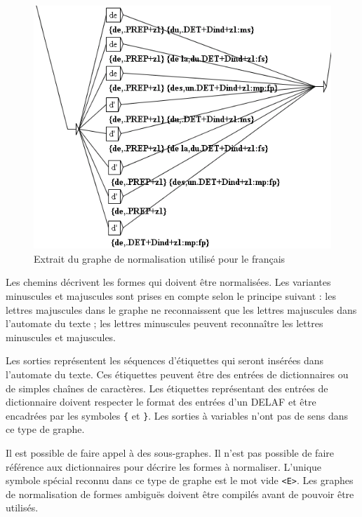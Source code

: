 \bigskip
\begin{figure}[!ht]
\begin{center}
\includegraphics[width=13.5cm]{resources/img/fig6-3.png}
\caption{Extrait du graphe de normalisation utilisé pour le
français\label{fig-tfst-normalization-grammar}}
\end{center}
\end{figure}

\noindent Les chemins décrivent les formes qui doivent être normalisées. Les variantes minuscules
et majuscules sont prises en compte selon le principe suivant : les lettres majuscules dans
le graphe ne reconnaissent que les lettres majuscules dans l’automate du texte ; les lettres
minuscules peuvent reconnaître les lettres minuscules et majuscules.

\bigskip
\noindent Les sorties représentent les séquences d’étiquettes qui seront insérées dans l’automate
du texte. Ces étiquettes peuvent être des entrées de dictionnaires ou de simples chaînes
de caractères. Les étiquettes représentant des entrées de dictionnaire doivent respecter le
format des entrées d’un DELAF et être encadrées par les symboles
\verb+{+ et \verb+}+. Les sorties à variables n’ont pas de sens dans ce type de graphe.


\bigskip
\noindent Il est possible de faire appel à des sous-graphes. Il n’est pas possible de faire référence
aux dictionnaires pour décrire les formes à normaliser. L’unique symbole spécial reconnu
dans ce type de graphe est le mot vide \verb+<E>+.
Les graphes de normalisation de formes ambiguës doivent être compilés avant de pouvoir être
utilisés.


